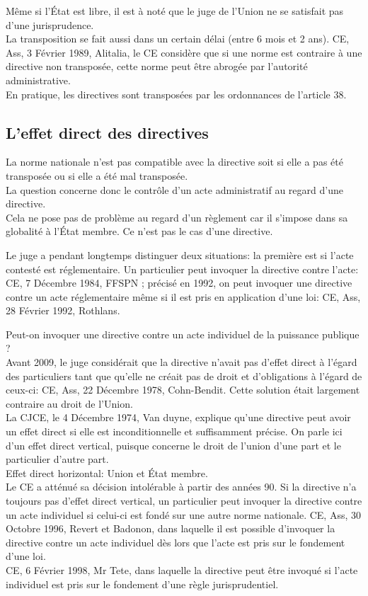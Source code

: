 \documentclass[10pt, a4paper, openany]{book}
\begin{document}
Même si l'État est libre, il est à noté que le juge de l'Union ne se satisfait pas d'une jurisprudence. \\
La transposition se fait aussi dans un certain délai (entre 6 mois et 2 ans). CE, Ass, 3 Février 1989, Alitalia, le CE considère que si une norme est contraire à une directive non transposée, cette norme peut être abrogée par l'autorité administrative. \\
En pratique, les directives sont transposées par les ordonnances de l'article 38. 

\subsection{L'effet direct des directives}

La norme nationale n'est pas compatible avec la directive soit si elle a pas été transposée ou si elle a été mal transposée. \\
La question concerne donc le contrôle d'un acte administratif au regard d'une directive. \\
Cela ne pose pas de problème au regard d'un règlement car il s'impose dans sa globalité à l'État membre. Ce n'est pas le cas d'une directive. 


Le juge a pendant longtemps distinguer deux situations: la première est si l'acte contesté est réglementaire. Un particulier peut invoquer la directive contre l'acte: CE, 7 Décembre 1984, FFSPN ; précisé en 1992, on peut invoquer une directive contre un acte réglementaire même si il est pris en application d'une loi: CE, Ass, 28 Février 1992, Rothlans. 


Peut-on invoquer une directive contre un acte individuel de la puissance publique ? \\
Avant 2009, le juge considérait que la directive n'avait pas d'effet direct à l'égard des particuliers tant que qu'elle ne créait pas de droit et d'obligations à l'égard de ceux-ci: CE, Ass, 22 Décembre 1978, Cohn-Bendit. Cette solution était largement contraire au droit de l'Union. \\
La CJCE, le 4 Décembre 1974, Van duyne, explique qu'une directive peut avoir un effet direct si elle est inconditionnelle et suffisamment précise. On parle ici d'un effet direct vertical, puisque concerne le droit de l'union d'une part et le particulier d'autre part. \\
Effet direct horizontal: Union et État membre. \\
Le CE a atténué sa décision intolérable à partir des années 90. Si la directive n'a toujours pas d'effet direct vertical, un particulier peut invoquer la directive contre un acte individuel si celui-ci est fondé sur une autre norme nationale. CE, Ass, 30 Octobre 1996, Revert et Badonon, dans laquelle il est possible d'invoquer la directive contre un acte individuel dès lors que l'acte est pris sur le fondement d'une loi. \\
CE, 6 Février 1998, Mr Tete, dans laquelle la directive peut être invoqué si l'acte individuel est pris sur le fondement d'une règle jurisprudentiel. 
\end{document}
